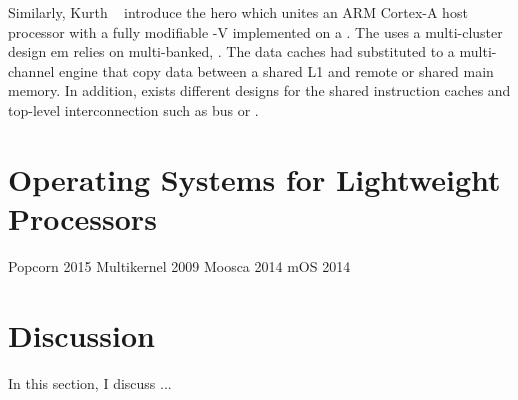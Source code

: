 	Similarly, Kurth \etal~\cite{Kurth2017} introduce the hero which unites an ARM Cortex-A host processor with a
	fully modifiable \risc-V \manycore implemented on a \fpga.
	The \pmca uses a multi-cluster design em relies on multi-banked, \spms.
	The data caches had substituted to a multi-channel \dma engine that copy data between a shared L1 \spm and
	remote \smps or shared main memory.
	In addition, exists different designs for the shared instruction caches and top-level interconnection such as bus or \noc.

\section{Operating Systems for Lightweight \manycore Processors}

	Popcorn 2015
	Multikernel 2009
	Moosca 2014
	mOS 2014

\section{Discussion}
	In this section, I discuss ...